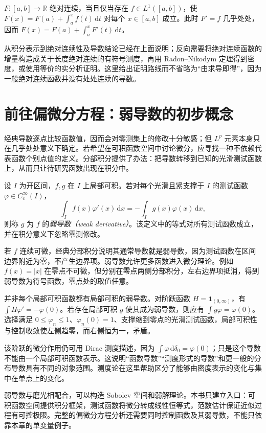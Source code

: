 \begin{theorem}[绝对连续函数的积分表示，引用]
$F:[a,b]\to\mathbb R$ 绝对连续，当且仅当存在 $f\in L^1([a,b])$，使
$F(x)=F(a)+\int_a^xf(t)\,\mathrm dt$ 对每个 $x\in[a,b]$ 成立。此时 $F'=f$ 几乎处处，因而
$F(x)=F(a)+\int_a^xF'(t)\,\mathrm dt$。
\end{theorem}
从积分表示到绝对连续性及导数结论已经在上面说明；反向需要将绝对连续函数的增量构造成关于长度绝对连续的有符号测度，再用 Radon--Nikodym 定理得到密度，或使用等价的实分析证明。这里给出证明路线而不省略为“由求导即得”，因为一般绝对连续函数并没有处处连续的导数。

\section{前往偏微分方程：弱导数的初步概念}
经典导数逐点比较函数值，因而会对零测集上的修改十分敏感；但 $L^p$ 元素本身只在几乎处处意义下确定。若希望在可积函数空间中讨论微分，应寻找一种不依赖代表函数个别点值的定义。分部积分提供了办法：把导数转移到已知的光滑测试函数上，从而只让待研究函数出现在积分中。

\begin{definition}
设 $I$ 为开区间，$f,g$ 在 $I$ 上局部可积。若对每个光滑且紧支撑于 $I$ 的测试函数 $\varphi\in C_c^\infty(I)$，
\[
 \int_I f(x)\varphi'(x)\,\mathrm dx
 =-\int_I g(x)\varphi(x)\,\mathrm dx,
\]
则称 $g$ 为 $f$ 的\emph{弱导数（weak derivative）}。该定义中的等式对所有测试函数成立，并在积分意义下忽略零测修改。
\end{definition}
若 $f$ 连续可微，经典分部积分说明其通常导数就是弱导数，因为测试函数在区间边界附近为零，不产生边界项。弱导数允许更多函数进入微分理论。例如 $f(x)=|x|$ 在零点不可微，但分别在零点两侧分部积分，左右边界项抵消，得到弱导数为符号函数，零点处的取值任意。

并非每个局部可积函数都有局部可积的弱导数。对阶跃函数 $H=\mathbf1_{(0,\infty)}$，有 $\int H\varphi'=-\varphi(0)$。若存在局部可积 $g$ 使其成为弱导数，则应有 $\int g\varphi=\varphi(0)$。选择满足 $0\leq\varphi_n\leq1$、$\varphi_n(0)=1$、支撑缩到零点的光滑测试函数，局部可积性与控制收敛使左侧趋零，而右侧恒为一，矛盾。

该阶跃的微分作用仍可用 Dirac 测度描述，因为 $\int\varphi\,\mathrm d\delta_0=\varphi(0)$；只是这个导数不能由一个局部可积函数表示。这说明“函数导数”“测度形式的导数”和更一般的分布导数具有不同的对象范围。测度论在这里帮助区分了能够由密度表示的变化与集中在单点上的变化。

弱导数与磨光相配合，可以构造 Sobolev 空间和弱解理论。本书只建立入口：可积函数空间提供积分框架，测试函数将微分转成线性恒等式，范数估计保证近似过程有可控极限。完整的偏微分方程分析还需要同时控制函数及其弱导数，不能只依靠本章的单变量例子。

